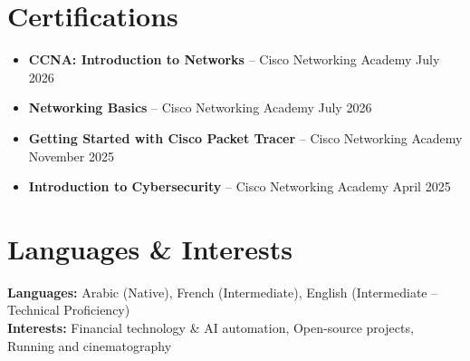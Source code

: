 \documentclass[a4paper,10pt]{article}
\begin{document}
\section*{Certifications}
\begin{itemize}[leftmargin=*, noitemsep, topsep=2pt]
    \item \textbf{CCNA: Introduction to Networks} -- Cisco Networking Academy \hfill July 2026
    \item \textbf{Networking Basics} -- Cisco Networking Academy \hfill July 2026
    \item \textbf{Getting Started with Cisco Packet Tracer} -- Cisco Networking Academy \hfill November 2025
    \item \textbf{Introduction to Cybersecurity} -- Cisco Networking Academy \hfill April 2025
\end{itemize}

\section*{Languages \& Interests}
\textbf{Languages:} Arabic (Native), French (Intermediate), English (Intermediate -- Technical Proficiency) \\
\textbf{Interests:} Financial technology \& AI automation, Open-source projects, Running and cinematography
\end{document}
